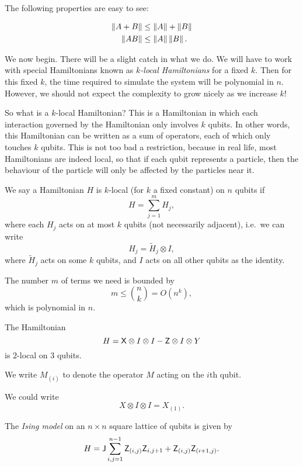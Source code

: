 The following properties are easy to see:
\begin{prop}
  \begin{align*}
    \left\lVert A + B\right\rVert &\leq \left\lVert A\right\rVert + \left\lVert B\right\rVert\\
    \left\lVert AB\right\rVert &\leq \left\lVert A\right\rVert\left\lVert B\right\rVert.
  \end{align*}
\end{prop}

We now begin. There will be a slight catch in what we do. We will have to work with special Hamiltonians known as \emph{$k$-local Hamiltonians} for a fixed $k$. Then for this fixed $k$, the time required to simulate the system will be polynomial in $n$. However, we should not expect the complexity to grow nicely as we increase $k$!

So what is a $k$-local Hamiltonian? This is a Hamiltonian in which each interaction governed by the Hamiltonian only involves $k$ qubits. In other words, this Hamiltonian can be written as a sum of operators, each of which only touches $k$ qubits. This is not too bad a restriction, because in real life, most Hamiltonians are indeed local, so that if each qubit represents a particle, then the behaviour of the particle will only be affected by the particles near it.

\begin{defi}
  We say a Hamiltonian $H$ is $k$-local (for $k$ a fixed constant) on $n$ qubits if
  \[
    H = \sum_{j = 1}^m H_j,
  \]
  where each $H_j$ acts on at most $k$ qubits (not necessarily adjacent), i.e.\ we can write
  \[
    H_j = \tilde{H}_j \otimes I,
  \]
  where $\tilde{H}_j$ acts on some $k$ qubits, and $I$ acts on all other qubits as the identity.
\end{defi}

The number $m$ of terms we need is bounded by
\[
  m \leq \binom{n}{k} = O(n^k),
\]
which is polynomial in $n$.

\begin{eg}
  The Hamiltonian
  \[
    H = \mathsf{X} \otimes I \otimes I - \mathsf{Z} \otimes I \otimes Y
  \]
  is $2$-local on $3$ qubits.
\end{eg}

We write $M_{(i)}$ to denote the operator $M$ acting on the $i$th qubit.
\begin{eg}
  We could write
  \[
    X \otimes I \otimes I = X_{(1)}.
  \]
\end{eg}

\begin{eg}
  The \emph{Ising model} on an $n \times n$ square lattice of qubits is given by
  \[
    H = \mathsf{J} \sum_{i, j = 1}^{n - 1} \mathsf{Z}_{(i, j)} \mathsf{Z}_{i, j + 1} + \mathsf{Z}_{(i, j)} \mathsf{Z}_{(i + 1, j)}.
  \]
\end{eg}

